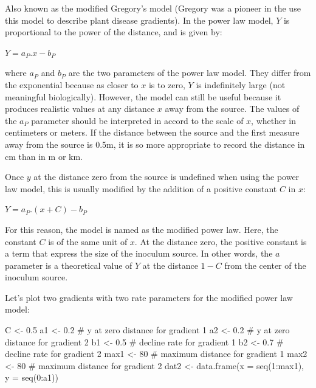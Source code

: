 \documentclass[
  letterpaper,
]{book}
\newenvironment{Shaded}{\begin{snugshade}}{\end{snugshade}}
\newcommand{\AttributeTok}[1]{\textcolor[rgb]{0.40,0.45,0.13}{#1}}
\newcommand{\CommentTok}[1]{\textcolor[rgb]{0.37,0.37,0.37}{#1}}
\newcommand{\DecValTok}[1]{\textcolor[rgb]{0.68,0.00,0.00}{#1}}
\newcommand{\FloatTok}[1]{\textcolor[rgb]{0.68,0.00,0.00}{#1}}
\newcommand{\FunctionTok}[1]{\textcolor[rgb]{0.28,0.35,0.67}{#1}}
\newcommand{\NormalTok}[1]{\textcolor[rgb]{0.00,0.23,0.31}{#1}}
\newcommand{\OtherTok}[1]{\textcolor[rgb]{0.00,0.23,0.31}{#1}}
\newcommand{\SpecialCharTok}[1]{\textcolor[rgb]{0.37,0.37,0.37}{#1}}
\begin{document}
Also known as the modified Gregory's model (Gregory was a pioneer in the
use this model to describe plant disease gradients). In the power law
model, \(Y\) is proportional to the power of the distance, and is given
by:

\(Y = a_{P}.x - b_{P}\)

where \(a_{P}\) and \(b_{P}\) are the two parameters of the power law
model. They differ from the exponential because as closer to \(x\) is to
zero, \(Y\) is indefinitely large (not meaningful biologically).
However, the model can still be useful because it produces realistic
values at any distance \(x\) away from the source. The values of the
\(a_{P}\) parameter should be interpreted in accord to the scale of
\(x\), whether in centimeters or meters. If the distance between the
source and the first measure away from the source is 0.5m, it is so more
appropriate to record the distance in cm than in m or km.

Once \(y\) at the distance zero from the source is undefined when using
the power law model, this is usually modified by the addition of a
positive constant \(C\) in \(x\):

\(Y = a_{P}.(x + C) - b_{P}\)

For this reason, the model is named as the modified power law. Here, the
constant \(C\) is of the same unit of \(x\). At the distance zero, the
positive constant is a term that express the size of the inoculum
source. In other words, the \(a\) parameter is a theoretical value of
\(Y\) at the distance \(1-C\) from the center of the inoculum source.

Let's plot two gradients with two rate parameters for the modified power
law model:

\begin{Shaded}
\begin{Highlighting}[]
\NormalTok{C }\OtherTok{\textless{}{-}} \FloatTok{0.5}
\NormalTok{a1 }\OtherTok{\textless{}{-}} \FloatTok{0.2} \CommentTok{\# y at zero distance for gradient 1}
\NormalTok{a2 }\OtherTok{\textless{}{-}} \FloatTok{0.2} \CommentTok{\# y at zero distance for gradient 2}
\NormalTok{b1 }\OtherTok{\textless{}{-}} \FloatTok{0.5} \CommentTok{\# decline rate for gradient 1}
\NormalTok{b2 }\OtherTok{\textless{}{-}} \FloatTok{0.7} \CommentTok{\# decline rate for gradient 2}
\NormalTok{max1 }\OtherTok{\textless{}{-}} \DecValTok{80} \CommentTok{\# maximum distance for gradient 1}
\NormalTok{max2 }\OtherTok{\textless{}{-}} \DecValTok{80} \CommentTok{\# maximum distance for gradient 2}
\NormalTok{dat2 }\OtherTok{\textless{}{-}} \FunctionTok{data.frame}\NormalTok{(}\AttributeTok{x =} \FunctionTok{seq}\NormalTok{(}\DecValTok{1}\SpecialCharTok{:}\NormalTok{max1), }\AttributeTok{y =} \FunctionTok{seq}\NormalTok{(}\DecValTok{0}\SpecialCharTok{:}\NormalTok{a1))}
\end{Highlighting}
\end{Shaded}
\end{document}
